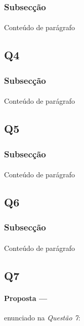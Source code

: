 \documentclass[12pt]{article}
\begin{document}
\subsubsection{Subsecção}
\paragraph{}

Conteúdo de parágrafo
\subsection{Q4}
\subsubsection{Subsecção}
\paragraph{}

Conteúdo de parágrafo
\subsection{Q5}
\subsubsection{Subsecção}
\paragraph{}

Conteúdo de parágrafo
\subsection{Q6}
\subsubsection{Subsecção}
\paragraph{}

Conteúdo de parágrafo
\subsection{Q7}

\paragraph{Proposta ---} enunciado na \textit{Questão 7}:
\end{document}
